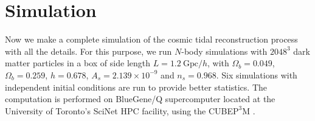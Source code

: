 \documentclass[aps,prd,twocolumn,showpacs,superscriptaddress,groupedaddress,nofootinbib]{revtex4}  %
\newcommand{\mr}{\mathrm}
\begin{document}


\section{Simulation}

Now we make a complete simulation of the cosmic tidal reconstruction 
process with all the details. For this purpose, 
we run $N$-body  simulations with $2048^3$ dark matter particles in a box
of side length $L=1.2\ \mr{Gpc}/h$, with $\Omega_b=0.049$, $\Omega_b=0.259$, $h=0.678$,
$A_s=2.139\times10^{-9}$ and $n_s=0.968$.  Six simulations with independent 
initial conditions are run to provide better statistics.
The computation is performed on BlueGene/Q supercomputer
located at the University of Toronto's SciNet HPC facility, 
using the CUBE$\mr{P}^3$M \cite{2013:code}. 
\end{document}
